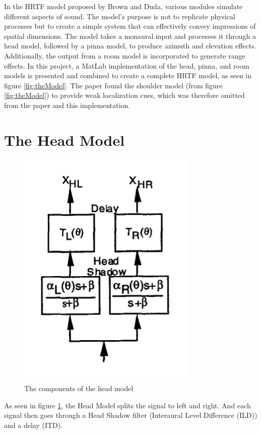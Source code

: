 \documentclass{assignment}
\begin{document}
In the HRTF model proposed by Brown and Duda, various modules simulate different aspects of sound. The model's purpose is not to replicate physical processes but to create a simple system that can effectively convey impressions of spatial dimensions. The model takes a monaural input and processes it through a head model, followed by a pinna model, to produce azimuth and elevation effects. Additionally, the output from a room model is incorporated to generate range effects. In this project, a MatLab implementation of the head, pinna, and room models is presented and combined to create a complete HRTF model, as seen in figure \ref{fig:theModel}. The paper found the shoulder model (from figure \ref{fig:theModel}) to provide weak localization cues, which was therefore omitted from the paper and this implementation. 

\section*{The Head Model}

\begin{figure}[h]
    \centering
    \includegraphics[scale = 0.4]{assets/HeadModel.png}
    \caption{The components of the head model}
    \label{fig:headModel}
\end{figure}

As seen in figure \ref{fig:headModel}, the Head Model splits the signal to left and right. And each signal then goes through a Head Shadow filter (Interaural Level Difference (ILD)) and a delay (ITD). \newline
\end{document}
